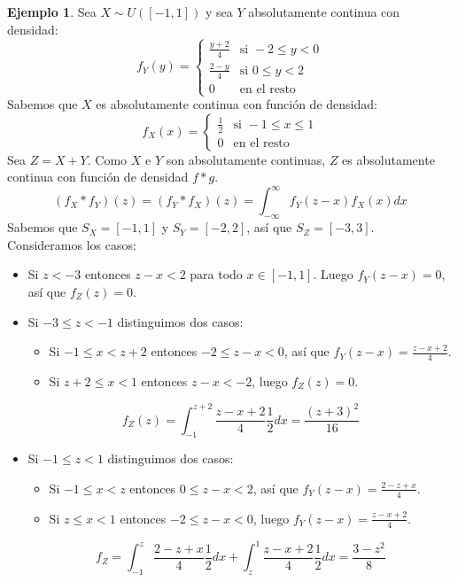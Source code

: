 \documentclass{report}
\theoremstyle{remark}
\theoremstyle{remark}
\theoremstyle{remark}
\theoremstyle{definition}
\theoremstyle{definition}
\theoremstyle{definition}
\newtheorem*{example}{Ejemplo}
\theoremstyle{definition}
\begin{document}
\begin{example}
    Sea $X \sim U([-1, 1])$ y sea $Y$ absolutamente continua con densidad:
    $$f_Y(y) = \begin{cases}
            \frac{y+2}{4} & \text{si } -2 \leq y < 0 \\
            \frac{2-y}{4} & \text{si } 0 \leq y < 2  \\
            0             & \text{en el resto}
        \end{cases}$$
    Sabemos que $X$ es absolutamente continua con función de densidad:
    $$f_X(x) = \begin{cases}
            \frac{1}{2} & \text{si } -1 \leq x \leq 1 \\
            0           & \text{en el resto}
        \end{cases}$$
    Sea $Z = X+Y$.
    Como $X$ e $Y$ son absolutamente continuas, $Z$ es absolutamente continua con función de densidad $f \ast g$.
    $$(f_X \ast f_Y)(z) = (f_Y \ast f_X)(z) = \int_{-\infty}^\infty f_Y(z-x) f_X(x) dx$$
    Sabemos que $S_X = [-1 ,1]$ y $S_Y = [-2, 2]$, así que $S_Z = [-3, 3]$.
    Consideramos los casos:
    \begin{itemize}
        \item Si $z < -3$ entonces $z-x < 2$ para todo $x \in [-1, 1]$.
              Luego $f_Y(z-x) = 0$, así que $f_Z(z) = 0$.
        \item Si $-3 \leq z < -1$ distinguimos dos casos:
              \begin{itemize}
                  \item Si $-1 \leq x < z+2$ entonces $-2 \leq z-x < 0$, así que $f_Y(z-x) = \frac{z-x+2}{4}$.
                  \item Si $z+2 \leq x < 1$ entonces $z-x < -2$, luego $f_Z(z) = 0$.
              \end{itemize}
              $$f_Z(z) = \int_{-1}^{z+2} \frac{z-x+2}{4} \frac{1}{2} dx = \frac{(z+3)^2}{16}$$
        \item Si $-1 \leq z < 1$ distinguimos dos casos:
              \begin{itemize}
                  \item Si $-1 \leq x < z$ entonces $0 \leq z-x < 2$, así que $f_Y(z-x) = \frac{2-z+x}{4}$.
                  \item Si $z \leq x < 1$ entonces $-2 \leq z-x < 0$, luego $f_Y(z-x) = \frac{z-x+2}{4}$.
              \end{itemize}
              $$f_Z = \int_{-1}^z \frac{2-z+x}{4} \frac{1}{2} dx + \int_z^1 \frac{z-x+2}{4} \frac{1}{2} dx = \frac{3-z^2}{8}$$

\end{itemize}
\end{example}
\end{document}
